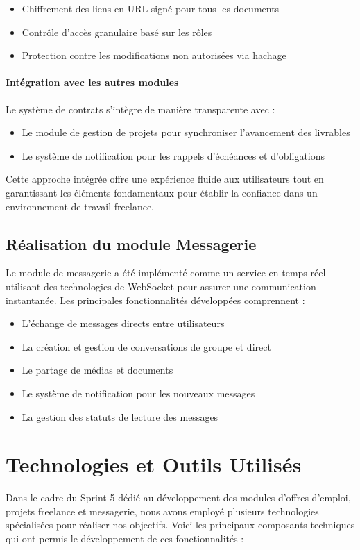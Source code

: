 \begin{itemize}
    \item Chiffrement des liens en URL signé pour tous les documents
    \item Contrôle d'accès granulaire basé sur les rôles
    \item Protection contre les modifications non autorisées via hachage 
  
\end{itemize}

\paragraph{Intégration avec les autres modules}
Le système de contrats s'intègre de manière transparente avec :

\begin{itemize}
    \item Le module de gestion de projets pour synchroniser l'avancement des livrables
    \item Le système de notification pour les rappels d'échéances et d'obligations
\end{itemize}

Cette approche intégrée offre une expérience fluide aux utilisateurs tout en garantissant les éléments fondamentaux pour établir la confiance dans un environnement de travail freelance.

\subsection{Réalisation du module Messagerie}
Le module de messagerie a été implémenté comme un service en temps réel utilisant des technologies de WebSocket pour assurer une communication instantanée. Les principales fonctionnalités développées comprennent :
\begin{itemize}
    \item L'échange de messages directs entre utilisateurs
    \item La création et gestion de conversations de groupe et direct
    \item Le partage de médias et documents
    \item Le système de notification pour les nouveaux messages
    \item La gestion des statuts de lecture des messages
\end{itemize}




\section{Technologies et Outils Utilisés}
Dans le cadre du Sprint 5 dédié au développement des modules d'offres d'emploi, projets freelance et messagerie, nous avons employé plusieurs technologies spécialisées pour réaliser nos objectifs. Voici les principaux composants techniques qui ont permis le développement de ces fonctionnalités :


